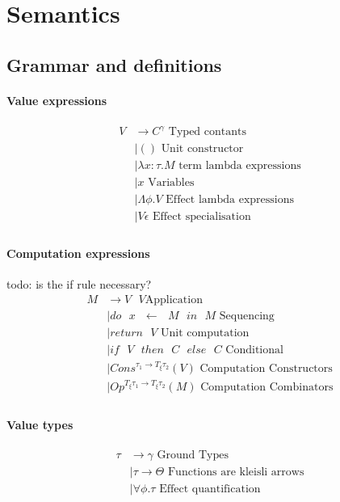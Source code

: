 \documentclass[twoside,a4paper,11pt]{article}
\newcommand{\s}{\mbox{ }}
\begin{document}
\section{Semantics}
\subsection{Grammar and definitions}

\paragraph{Value expressions}

\begin{equation}
\label{PDefifinition}
\begin{split}
V  &\rightarrow C^{\gamma} \mbox{ Typed contants}\\
&\mid () \mbox{ Unit constructor}\\
&\mid \lambda x: \tau. M \mbox{ term lambda expressions}\\
&\mid x \mbox{ Variables}\\
&\mid \Lambda \phi. V \mbox{ Effect lambda expressions}\\
&\mid V \epsilon \mbox{ Effect specialisation}\\
\end{split}
\end{equation} 

\paragraph{Computation expressions}
todo: is the if rule necessary?
\begin{equation}
\label{PDefifinition}
\begin{split}
M & \rightarrow V \s V \mbox{Application}\\
&\mid do \s x \s \leftarrow \s M \s in \s M \mbox{ Sequencing}\\
&\mid return\s V \mbox{ Unit computation}\\
&\mid if\s V\s then\s C \s else \s C \mbox{ Conditional}\\
&\mid Cons^{\tau_1 \rightarrow T_{\xi} \tau_2}(V) \mbox{ Computation Constructors}\\
&\mid Op^{T_{\xi} \tau_1 \rightarrow T_{\xi} \tau_2}(M) \mbox{ Computation Combinators}\\
\end{split}
\end{equation} 

\paragraph{Value types}
\begin{equation}
\label{PDefifinition}
\begin{split}
\tau & \rightarrow \gamma \mbox{ Ground Types}\\
&\mid \tau \rightarrow \Theta \mbox{ Functions are kleisli arrows}\\
&\mid \forall \phi. \tau \mbox{ Effect quantification}\\
\end{split}
\end{equation} 
\end{document}
